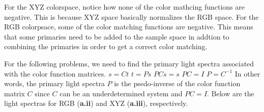 \documentclass[12pt,twoside]{article}
\newcommand{\tabUnit}{3ex}
\newcommand{\tabT}{\hspace*{\tabUnit}}
\begin{document}
For the XYZ colorspace, notice how none of the color mathcing functions are negative.  This is because XYZ space basically normalizes the RGB space.
For the RGB colorpsace, some of the color matching functions are negative.  This means that some primaries need to be added to the sample space in addtion to combining the primaries in order to get a correct color matching.
\newline



For the following problems, we need to find the primary light spectra associated with the color function matrices.
\newline
\tabT\tabT\tabT\tabT\tabT\tabT\tabT\tabT\tabT$s = Ct$ \newline
\tabT\tabT\tabT\tabT\tabT\tabT\tabT\tabT\tabT$t = Ps$ \newline
\tabT\tabT\tabT\tabT\tabT\tabT\tabT\tabT\tabT$PCs = s$ \newline
\tabT\tabT\tabT\tabT\tabT\tabT\tabT\tabT\tabT$PC = I$ \newline
\tabT\tabT\tabT\tabT\tabT\tabT\tabT\tabT\tabT$P = C^{-1}$ \newline
\newline
In other words, the primary light spectra $P$ is the psedo-inverse of the color function matrix $C$ since $C$ can be an underdetermined system and $PC = I$.  Below are the light spectras for RGB (\textbf{a.ii}) and XYZ (\textbf{a.iii}), respectively.
\newline
{}
\end{document}
